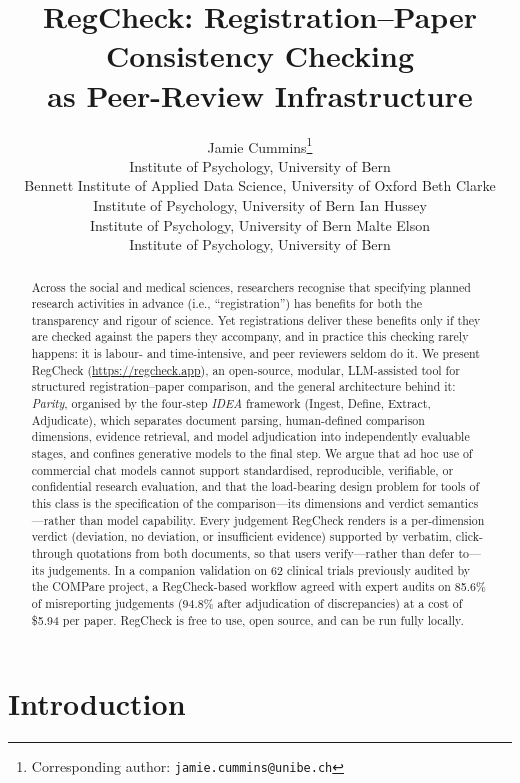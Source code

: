 \documentclass{article}
\title{RegCheck: Registration--Paper Consistency Checking\\as Peer-Review Infrastructure}
\author{%
  Jamie Cummins\thanks{Corresponding author: \texttt{jamie.cummins@unibe.ch}} \\
  Institute of Psychology, University of Bern\\
  Bennett Institute of Applied Data Science, University of Oxford
  \And
  Beth Clarke \\
  Institute of Psychology, University of Bern
  \And
  Ian Hussey \\
  Institute of Psychology, University of Bern
  \And
  Malte Elson \\
  Institute of Psychology, University of Bern
}
\begin{document}
\maketitle

\begin{abstract} %
Across the social and medical sciences, researchers recognise that specifying
planned research activities in advance (i.e., ``registration'') has benefits for
both the transparency and rigour of science. Yet registrations deliver these
benefits only if they are checked against the papers they accompany, and in
practice this checking rarely happens: it is labour- and time-intensive, and
peer reviewers seldom do it. We present RegCheck
(\url{https://regcheck.app}), an open-source, modular, LLM-assisted tool for
structured registration--paper comparison, and the general architecture behind
it: \emph{Parity}, organised by the four-step \emph{IDEA} framework (Ingest,
Define, Extract, Adjudicate), which separates document parsing, human-defined
comparison dimensions, evidence retrieval, and model adjudication into
independently evaluable stages, and confines generative models to the final
step. We argue that ad hoc use of commercial chat models cannot support
standardised, reproducible, verifiable, or confidential research evaluation, and
that the load-bearing design problem for tools of this class is the
specification of the comparison---its dimensions and verdict semantics---rather
than model capability. Every judgement RegCheck renders is a per-dimension
verdict (deviation, no deviation, or insufficient evidence) supported by
verbatim, click-through quotations from both documents, so that users
verify---rather than defer to---its judgements. In a companion validation on 62
clinical trials previously audited by the COMPare project, a RegCheck-based
workflow agreed with expert audits on 85.6\% of misreporting judgements (94.8\%
after adjudication of discrepancies) at a cost of \$5.94 per paper. RegCheck is
free to use, open source, and can be run fully locally.
\end{abstract}

\section{Introduction}\label{sec:intro}
\end{document}
